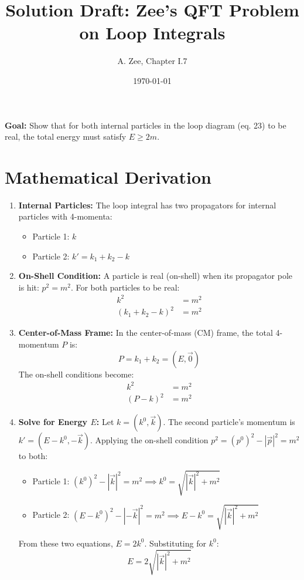 \documentclass[11pt, a4paper]{article}
\title{Solution Draft: Zee's QFT Problem on Loop Integrals}
\author{A. Zee, Chapter I.7}
\date{\today}
\begin{document}
\maketitle
\thispagestyle{empty}

\textbf{Goal:} Show that for both internal particles in the loop diagram (eq. 23) to be real, the total energy must satisfy $E \ge 2m$.

\section*{Mathematical Derivation}

\begin{enumerate}
    \item \textbf{Internal Particles:} The loop integral has two propagators for internal particles with 4-momenta:
    \begin{itemize}
        \item Particle 1: $k$
        \item Particle 2: $k' = k_1 + k_2 - k$
    \end{itemize}

    \item \textbf{On-Shell Condition:} A particle is real (on-shell) when its propagator pole is hit: $p^2 = m^2$. For both particles to be real:
    \begin{align}
        k^2 &= m^2 \label{eq:cond1} \\
        (k_1 + k_2 - k)^2 &= m^2 \label{eq:cond2}
    \end{align}

    \item \textbf{Center-of-Mass Frame:} In the center-of-mass (CM) frame, the total 4-momentum $P$ is:
    $$P = k_1 + k_2 = (E, \vec{0})$$
    The on-shell conditions become:
    \begin{align}
        k^2 &= m^2 \label{eq:cond3} \\
        (P - k)^2 &= m^2 \label{eq:cond4}
    \end{align}

    \item \textbf{Solve for Energy $E$:} Let $k = (k^0, \vec{k})$. The second particle's momentum is $k' = (E - k^0, -\vec{k})$. Applying the on-shell condition $p^2 = (p^0)^2 - |\vec{p}|^2 = m^2$ to both:
    \begin{itemize}
        \item Particle 1: $(k^0)^2 - |\vec{k}|^2 = m^2 \implies k^0 = \sqrt{|\vec{k}|^2 + m^2}$
        \item Particle 2: $(E - k^0)^2 - |-\vec{k}|^2 = m^2 \implies E - k^0 = \sqrt{|\vec{k}|^2 + m^2}$
    \end{itemize}
    From these two equations, $E = 2k^0$. Substituting for $k^0$:
    $$E = 2\sqrt{|\vec{k}|^2 + m^2}$$


\end{enumerate}
\end{document}
